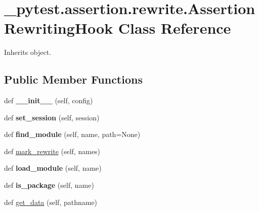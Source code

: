 \hypertarget{class__pytest_1_1assertion_1_1rewrite_1_1_assertion_rewriting_hook}{}\section{\+\_\+pytest.\+assertion.\+rewrite.\+Assertion\+Rewriting\+Hook Class Reference}
\label{class__pytest_1_1assertion_1_1rewrite_1_1_assertion_rewriting_hook}


Inherits object.

\subsection*{Public Member Functions}
\begin{DoxyCompactItemize}
\item 
\mbox{\label{class__pytest_1_1assertion_1_1rewrite_1_1_assertion_rewriting_hook_ad401304a2b2a6a0d0d495babb9a94ab2}} 
def {\bfseries \+\_\+\+\_\+init\+\_\+\+\_\+} (self, config)
\item 
\mbox{\label{class__pytest_1_1assertion_1_1rewrite_1_1_assertion_rewriting_hook_a4bee77f19fc3451017426a42d0049113}} 
def {\bfseries set\+\_\+session} (self, session)
\item 
\mbox{\label{class__pytest_1_1assertion_1_1rewrite_1_1_assertion_rewriting_hook_a3ba3ec97db9f26f1eaa159a1c6bbc5c8}} 
def {\bfseries find\+\_\+module} (self, name, path=None)
\item 
def \hyperlink{class__pytest_1_1assertion_1_1rewrite_1_1_assertion_rewriting_hook_a49c937758dd2c23067a120cbbb34eb76}{mark\+\_\+rewrite} (self, names)
\item 
\mbox{\label{class__pytest_1_1assertion_1_1rewrite_1_1_assertion_rewriting_hook_a184a0ea858babbfd9ae3d69cdd423d64}} 
def {\bfseries load\+\_\+module} (self, name)
\item 
\mbox{\label{class__pytest_1_1assertion_1_1rewrite_1_1_assertion_rewriting_hook_a4f3204acea4ec4a7c04e89106a0fe71e}} 
def {\bfseries is\+\_\+package} (self, name)
\item 
def \hyperlink{class__pytest_1_1assertion_1_1rewrite_1_1_assertion_rewriting_hook_a261402f25cf80500773045056b71ea5b}{get\+\_\+data} (self, pathname)
\end{DoxyCompactItemize}
